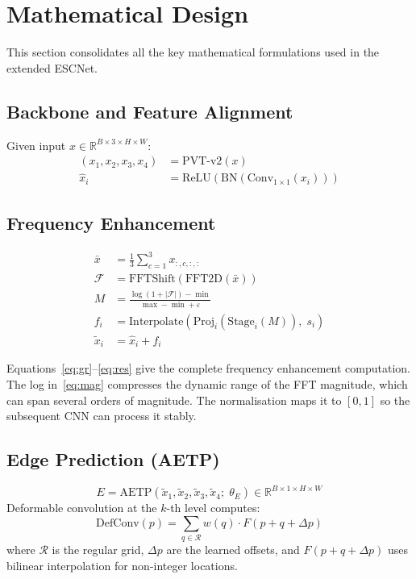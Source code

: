 \documentclass[12pt,a4paper]{report}
\begin{document}
\section{Mathematical Design}\label{sec:mathdesign}

This section consolidates all the key mathematical formulations used in the extended ESCNet.

\subsection{Backbone and Feature Alignment}

Given input $x \in \mathbb{R}^{B\times3\times H\times W}$:
\begin{align}
  (x_1,x_2,x_3,x_4) &= \text{PVT-v2}(x) \label{eq:m1}\\
  \hat{x}_i &= \text{ReLU}(\text{BN}(\text{Conv}_{1\times1}(x_i))) \label{eq:m2}
\end{align}

\subsection{Frequency Enhancement}

\begin{align}
  \bar{x} &= \frac{1}{3}\sum_{c=1}^{3} x_{:,c,:,:} \label{eq:gr}\\
  \mathcal{F} &= \text{FFTShift}(\text{FFT2D}(\bar{x})) \label{eq:fft}\\
  M &= \frac{\log(1+|\mathcal{F}|) - \min}{\max - \min + \varepsilon} \label{eq:mag}\\
  f_i &= \text{Interpolate}(\text{Proj}_i(\text{Stage}_i(M)),\; s_i) \label{eq:fi}\\
  \tilde{x}_i &= \hat{x}_i + f_i \label{eq:res}
\end{align}

Equations~\eqref{eq:gr}--\eqref{eq:res} give the complete frequency enhancement computation. The log in~\eqref{eq:mag} compresses the dynamic range of the FFT magnitude, which can span several orders of magnitude. The normalisation maps it to $[0,1]$ so the subsequent CNN can process it stably.

\subsection{Edge Prediction (AETP)}

\begin{equation}
  E = \text{AETP}(\tilde{x}_1,\tilde{x}_2,\tilde{x}_3,\tilde{x}_4;\; \theta_E)
  \in \mathbb{R}^{B\times1\times H\times W}
  \label{eq:edge}
\end{equation}
Deformable convolution at the $k$-th level computes:
\begin{equation}
  \text{DefConv}(p) = \sum_{q \in \mathcal{R}} w(q) \cdot F(p + q + \Delta p)
  \label{eq:defconv}
\end{equation}
where $\mathcal{R}$ is the regular grid, $\Delta p$ are the learned offsets, and $F(p+q+\Delta p)$ uses bilinear interpolation for non-integer locations.
\end{document}
